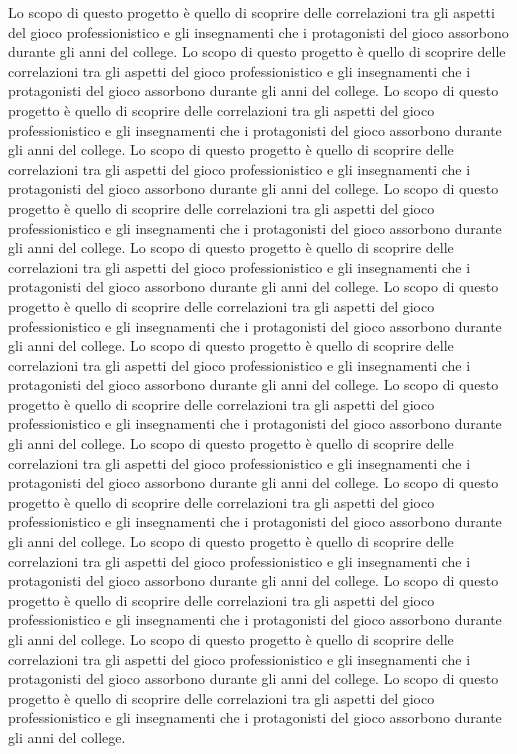 \documentclass[10pt,a4paper]{article}
\begin{document}
Lo scopo di questo progetto è quello di scoprire delle correlazioni tra gli aspetti del gioco professionistico e gli insegnamenti che i protagonisti del gioco assorbono durante gli anni del college.
Lo scopo di questo progetto è quello di scoprire delle correlazioni tra gli aspetti del gioco professionistico e gli insegnamenti che i protagonisti del gioco assorbono durante gli anni del college.
Lo scopo di questo progetto è quello di scoprire delle correlazioni tra gli aspetti del gioco professionistico e gli insegnamenti che i protagonisti del gioco assorbono durante gli anni del college.
Lo scopo di questo progetto è quello di scoprire delle correlazioni tra gli aspetti del gioco professionistico e gli insegnamenti che i protagonisti del gioco assorbono durante gli anni del college.
Lo scopo di questo progetto è quello di scoprire delle correlazioni tra gli aspetti del gioco professionistico e gli insegnamenti che i protagonisti del gioco assorbono durante gli anni del college.
Lo scopo di questo progetto è quello di scoprire delle correlazioni tra gli aspetti del gioco professionistico e gli insegnamenti che i protagonisti del gioco assorbono durante gli anni del college.
Lo scopo di questo progetto è quello di scoprire delle correlazioni tra gli aspetti del gioco professionistico e gli insegnamenti che i protagonisti del gioco assorbono durante gli anni del college.
Lo scopo di questo progetto è quello di scoprire delle correlazioni tra gli aspetti del gioco professionistico e gli insegnamenti che i protagonisti del gioco assorbono durante gli anni del college.
Lo scopo di questo progetto è quello di scoprire delle correlazioni tra gli aspetti del gioco professionistico e gli insegnamenti che i protagonisti del gioco assorbono durante gli anni del college.
Lo scopo di questo progetto è quello di scoprire delle correlazioni tra gli aspetti del gioco professionistico e gli insegnamenti che i protagonisti del gioco assorbono durante gli anni del college.
Lo scopo di questo progetto è quello di scoprire delle correlazioni tra gli aspetti del gioco professionistico e gli insegnamenti che i protagonisti del gioco assorbono durante gli anni del college.
Lo scopo di questo progetto è quello di scoprire delle correlazioni tra gli aspetti del gioco professionistico e gli insegnamenti che i protagonisti del gioco assorbono durante gli anni del college.
Lo scopo di questo progetto è quello di scoprire delle correlazioni tra gli aspetti del gioco professionistico e gli insegnamenti che i protagonisti del gioco assorbono durante gli anni del college.
Lo scopo di questo progetto è quello di scoprire delle correlazioni tra gli aspetti del gioco professionistico e gli insegnamenti che i protagonisti del gioco assorbono durante gli anni del college.
Lo scopo di questo progetto è quello di scoprire delle correlazioni tra gli aspetti del gioco professionistico e gli insegnamenti che i protagonisti del gioco assorbono durante gli anni del college.
\end{document}
